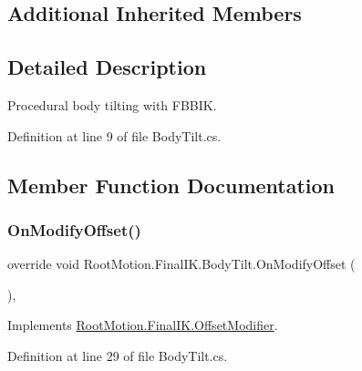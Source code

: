 \subsection*{Additional Inherited Members}


\subsection{Detailed Description}
Procedural body tilting with F\+B\+B\+IK. 



Definition at line 9 of file Body\+Tilt.\+cs.



\subsection{Member Function Documentation}
\mbox{\label{class_root_motion_1_1_final_i_k_1_1_body_tilt_a5a68b6792b8b58c5a5aa24ace1569526}} 
\subsubsection{\texorpdfstring{On\+Modify\+Offset()}{OnModifyOffset()}}
{\footnotesize\ttfamily override void Root\+Motion.\+Final\+I\+K.\+Body\+Tilt.\+On\+Modify\+Offset (\begin{DoxyParamCaption}{ }\end{DoxyParamCaption})\hspace{0.3cm}{\ttfamily [protected]}, {\ttfamily [virtual]}}



Implements \mbox{\hyperlink{class_root_motion_1_1_final_i_k_1_1_offset_modifier_a777e9ffb4afca3d8647959a79a1120bb}{Root\+Motion.\+Final\+I\+K.\+Offset\+Modifier}}.



Definition at line 29 of file Body\+Tilt.\+cs.

\mbox{\label{class_root_motion_1_1_final_i_k_1_1_body_tilt_a221000faf3644c7bda0c809ba09acff4}} 
